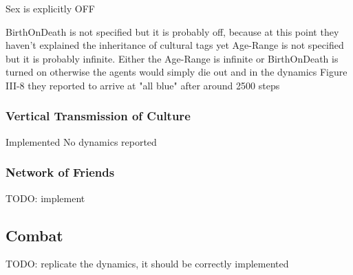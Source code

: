 Sex is explicitly OFF

BirthOnDeath is not specified but it is probably off, because at this point they haven't explained the inheritance of cultural tags yet
Age-Range is not specified but it is probably infinite. Either the Age-Range is infinite or BirthOnDeath is turned on otherwise the agents would simply die out and in the dynamics Figure III-8 they reported to arrive at "all blue" after around 2500 steps

\subsubsection{Vertical Transmission of Culture}
Implemented
No dynamics reported

\subsubsection{Network of Friends}
TODO: implement

\subsection{Combat}
TODO: replicate the dynamics, it should be correctly implemented